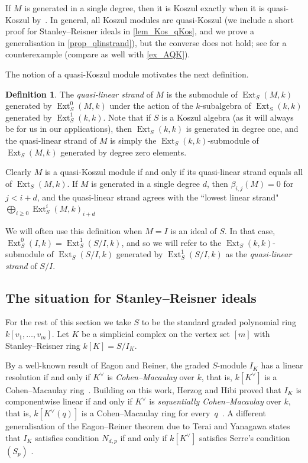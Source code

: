 \documentclass[a4paper,10pt]{amsart}
\theoremstyle{definition}
\newtheorem{definition}[theorem]{Definition}
\theoremstyle{remark}
\DeclareMathOperator{\Ext}{Ext}
\begin{document}
If $M$ is generated in a single degree, then it is Koszul exactly when it is quasi-Koszul by~\cite[Proposition~4.4]{CS}. In general, all Koszul modules are quasi-Koszul (we include a short proof for Stanley--Reisner ideals in \cref{lem_Kos_qKos}, and we prove a generalisation in \cref{prop_qlinstrand}), but the converse does not hold; see \cite[Example~7.2]{CS} for a counterexample (compare as well with \cref{ex_AQK}).

The notion of a quasi-Koszul module motivates the next definition.

\begin{definition} \label{def_strand}
The \emph{quasi-linear strand} of $M$ is the submodule of $\Ext_S(M,k)$ generated by $\Ext_S^0(M,k)$ under the action of the $k$-subalgebra  of $\Ext_S(k,k)$ generated by $\Ext_S^1(k,k)$. Note that if $S$ is a Koszul algebra (as it will always be for us in our applications), then $\Ext_S(k,k)$ is generated in degree one, and the quasi-linear strand of $M$ is simply the $\Ext_S(k,k)$-submodule of $\Ext_S(M,k)$ generated by degree zero elements.
\end{definition}

Clearly $M$ is a quasi-Koszul module if and only if its quasi-linear strand equals all of $\Ext_S(M,k)$. If $M$ is generated in a single degree $d$, then $\beta_{i,j}(M)=0$ for $j<i+d$, and the quasi-linear strand agrees with the ``lowest linear strand" $\bigoplus_{i\geqslant 0} \Ext_S^i(M,k)_{i+d}$

We will often use this definition when $M=I$ is an ideal of $S$. In that case, $\Ext_S^0(I,k)=\Ext_S^1(S/I,k)$, and so we will refer to the $\Ext_S(k,k)$-submodule of $\Ext_S(S/I,k)$ generated by $\Ext_S^1(S/I,k)$ as the \emph{quasi-linear strand} of $S/I$. 



\subsection*{The situation for Stanley--Reisner ideals} For the rest of this section we take $S$ to be the standard graded polynomial ring $k[v_1,\ldots,v_m]$. Let $K$ be a simplicial complex on the vertex set $[m]$ with Stanley--Reisner ring $k[K]=S/I_K$. 

By a well-known result of Eagon and Reiner, the graded $S$-module $I_K$ has a linear resolution if and only if $K^\vee$ is \emph{Cohen--Macaulay} over $k$, that is, $k[K^\vee]$ is a Cohen--Macaulay ring~\cite[Theorem~3]{ER}. Building on this work, Herzog and Hibi proved that $I_K$ is componentwise linear if and only if $K^\vee$ is \emph{sequentially Cohen--Macaulay} over $k$, that is, $k[K^\vee(q)]$ is a Cohen--Macaulay ring for every~$q$~\cite[Theorem 2.1]{HH}. A different generalisation of the Eagon--Reiner theorem due to Terai and Yanagawa states that $I_K$ satisfies condition $N_{d,p}$ if and only if $k[K^\vee]$ satisfies Serre's condition $(S_p)$ \cite[Corollary~3.7]{Y}.
\end{document}
